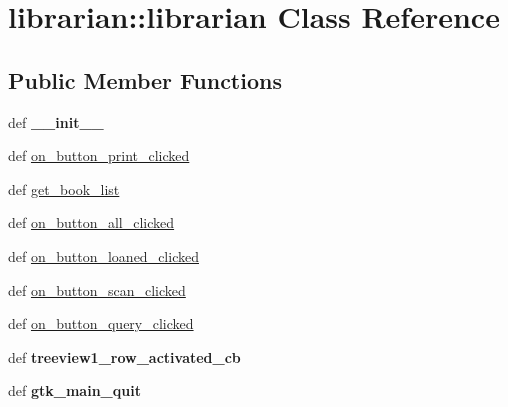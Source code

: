 \hypertarget{classlibrarian_1_1librarian}{
\section{librarian::librarian Class Reference}
\label{classlibrarian_1_1librarian}
}
\subsection*{Public Member Functions}
\begin{DoxyCompactItemize}
\item 
\hypertarget{classlibrarian_1_1librarian_a38767385296af734d843625e880b0f8c}{
def {\bfseries \_\-\_\-init\_\-\_\-}}
\label{classlibrarian_1_1librarian_a38767385296af734d843625e880b0f8c}

\item 
def \hyperlink{classlibrarian_1_1librarian_a8d9587a840f943752194b2c8b61f18a3}{on\_\-button\_\-print\_\-clicked}
\item 
def \hyperlink{classlibrarian_1_1librarian_af1b5a6a4ddf9b300601f1cdc6737ecd4}{get\_\-book\_\-list}
\item 
def \hyperlink{classlibrarian_1_1librarian_a7fb611e38bedeac2295e1ecb2b8aa2cc}{on\_\-button\_\-all\_\-clicked}
\item 
def \hyperlink{classlibrarian_1_1librarian_a7bb690bc8c84830399479b6f47eef8b0}{on\_\-button\_\-loaned\_\-clicked}
\item 
def \hyperlink{classlibrarian_1_1librarian_ad44a8c5d7a8ccb8d2c75e13eccb276b1}{on\_\-button\_\-scan\_\-clicked}
\item 
def \hyperlink{classlibrarian_1_1librarian_af71bf023c78a90863f2505562ad95d95}{on\_\-button\_\-query\_\-clicked}
\item 
\hypertarget{classlibrarian_1_1librarian_af63e0d742fc6a1d82c9097c4c3c7f5c2}{
def {\bfseries treeview1\_\-row\_\-activated\_\-cb}}
\label{classlibrarian_1_1librarian_af63e0d742fc6a1d82c9097c4c3c7f5c2}

\item 
\hypertarget{classlibrarian_1_1librarian_aa904a6cfbe8a124965f9e2c148f64227}{
def {\bfseries gtk\_\-main\_\-quit}}
\label{classlibrarian_1_1librarian_aa904a6cfbe8a124965f9e2c148f64227}

\end{DoxyCompactItemize}
